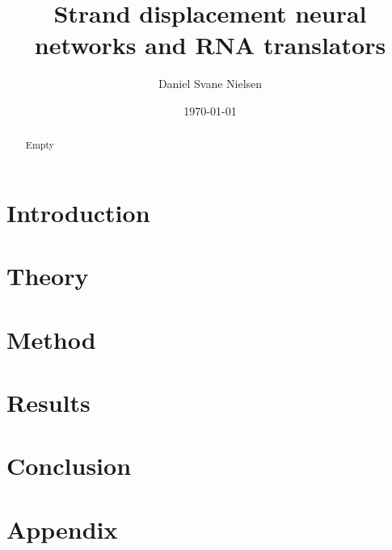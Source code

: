 \documentclass{report}
\title{Strand displacement neural networks and RNA translators}
\author{Daniel Svane Nielsen}
\date{\today}
\begin{document}
  \maketitle

  \begin{abstract}
  Empty
  \end{abstract}

  \tableofcontents

  \chapter{Introduction}
  
  \chapter{Theory}
  
  
  \chapter{Method}
  
  \chapter{Results}
  
  \chapter{Conclusion}
  

  
  

  \appendix
  \chapter{Appendix}
  
\end{document}
